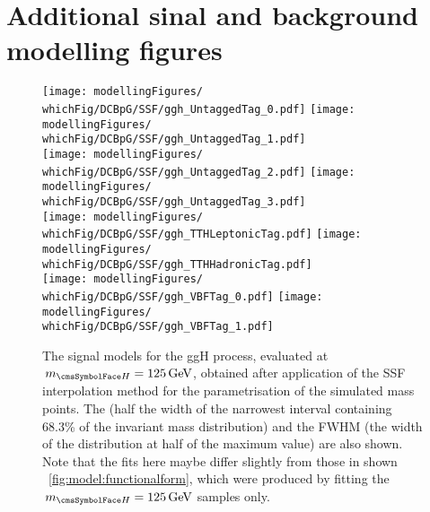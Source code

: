 \chapter{Additional sinal and background modelling figures}
\label{app:modelling}

\begin{figure}[htp!]
\centering
\texttt{[image: modellingFigures/\\whichFig/DCBpG/SSF/ggh\_UntaggedTag\_0.pdf]} 
\texttt{[image: modellingFigures/\\whichFig/DCBpG/SSF/ggh\_UntaggedTag\_1.pdf]} \\
\texttt{[image: modellingFigures/\\whichFig/DCBpG/SSF/ggh\_UntaggedTag\_2.pdf]} 
\texttt{[image: modellingFigures/\\whichFig/DCBpG/SSF/ggh\_UntaggedTag\_3.pdf]} \\ 
\texttt{[image: modellingFigures/\\whichFig/DCBpG/SSF/ggh\_TTHLeptonicTag.pdf]} 
\texttt{[image: modellingFigures/\\whichFig/DCBpG/SSF/ggh\_TTHHadronicTag.pdf]} \\ 
\texttt{[image: modellingFigures/\\whichFig/DCBpG/SSF/ggh\_VBFTag\_0.pdf]} 
\texttt{[image: modellingFigures/\\whichFig/DCBpG/SSF/ggh\_VBFTag\_1.pdf]} \\

\caption{The signal models for the ggH process, evaluated at $\mH=125\GeV$, obtained after application of the SSF interpolation method for the \DCBpG parametrisation of the simulated mass points. The \effSigma (half the width of the narrowest interval containing 68.3\% of the invariant mass distribution) and the FWHM (the width of the distribution at half of the maximum value) are also shown. Note that the fits here maybe differ slightly from those in shown \Fig~\ref{fig:model:functionalform}, which were produced by fitting the $\mH=125\GeV$ samples only.}

\label{fig:model:sig_model_per_ggh}
\end{figure}

